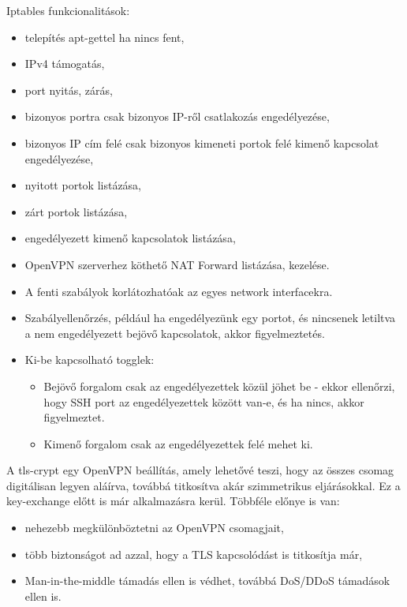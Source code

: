 \pagebreak

Iptables funkcionalitások:
\begin{itemize}
	\item telepítés apt-gettel ha nincs fent,
	\item IPv4 támogatás,
	\item port nyitás, zárás,
	\item bizonyos portra csak bizonyos IP-ről csatlakozás engedélyezése,
	\item bizonyos IP cím felé csak bizonyos kimeneti portok felé kimenő kapcsolat engedélyezése,
	\item nyitott portok listázása,
	\item zárt portok listázása,
	\item engedélyezett kimenő kapcsolatok listázása,
	\item OpenVPN szerverhez köthető NAT Forward listázása, kezelése.
	\item A fenti szabályok korlátozhatóak az egyes network interfacekra.
	\item Szabályellenőrzés, például ha engedélyezünk egy portot, és nincsenek letiltva a nem engedélyezett bejövő kapcsolatok, akkor figyelmeztetés.
	\item Ki-be kapcsolható togglek:
		\begin{itemize}
			\item Bejövő forgalom csak az engedélyezettek közül jöhet be - ekkor ellenőrzi, hogy SSH port az engedélyezettek között van-e, és ha nincs, akkor figyelmeztet.
			\item Kimenő forgalom csak az engedélyezettek felé mehet ki.
		\end{itemize}
\end{itemize}

 \label{ref:tls-crypt}
A tls-crypt egy OpenVPN beállítás, amely lehetővé teszi, hogy az összes csomag digitálisan legyen aláírva, továbbá titkosítva akár szimmetrikus eljárásokkal. Ez a key-exchange előtt is már alkalmazásra kerül. \cite{openvpnmanual}
Többféle előnye is van:
\begin{itemize}
	\item nehezebb megkülönböztetni az OpenVPN csomagjait,
	\item több biztonságot ad azzal, hogy a TLS kapcsolódást is titkosítja már,
	\item Man-in-the-middle támadás ellen is védhet, továbbá DoS/DDoS támadások ellen is.
\end{itemize}

